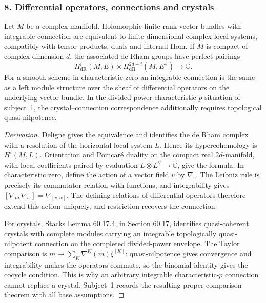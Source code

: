 \subsubsection{8. Differential operators, connections and crystals}
\begin{proposition}\label{B:subject8}
Let $M$ be a complex manifold. Holomorphic finite-rank vector bundles with integrable connection are equivalent to finite-dimensional complex local systems, compatibly with tensor products, duals and internal Hom. If $M$ is compact of complex dimension $d$, the associated de Rham groups have perfect pairings
\[
 H^i_{\mathrm{dR}}(M,E)\times H^{2d-i}_{\mathrm{dR}}(M,E^\vee)
 \longrightarrow\mathbb C.
\]
For a smooth scheme in characteristic zero an integrable connection is the same as a left module structure over the sheaf of differential operators on the underlying vector bundle. In the divided-power characteristic-$p$ situation of subject~1, the crystal--connection correspondence additionally requires topological quasi-nilpotence.
\end{proposition}
\begin{proof}[Derivation]
Deligne \cite[I, Theorem 2.17 and Propositions 2.18--2.19]{BDeligne1970} gives the equivalence and identifies the de Rham complex with a resolution of the horizontal local system $L$. Hence its hypercohomology is $H^i(M,L)$. Orientation and Poincar\'e duality on the compact real $2d$-manifold, with local coefficients paired by evaluation $L\otimes L^\vee\to\mathbb C$, give the formula. In characteristic zero, define the action of a vector field $v$ by $\nabla_v$. The Leibniz rule is precisely its commutator relation with functions, and integrability gives $[\nabla_v,\nabla_w]=\nabla_{[v,w]}$. The defining relations of differential operators therefore extend this action uniquely, and restriction recovers the connection.

For crystals, Stacks Lemma 60.17.4, in Section 60.17, identifies quasi-coherent crystals with complete modules carrying an integrable topologically quasi-nilpotent connection on the completed divided-power envelope. The Taylor comparison is $m\mapsto\sum_K\nabla^K(m)\xi^{[K]}$: quasi-nilpotence gives convergence and integrability makes the operators commute, so the binomial identity gives the cocycle condition. This is why an arbitrary integrable characteristic-$p$ connection cannot replace a crystal. Subject~1 records the resulting proper comparison theorem with all base assumptions.
\end{proof}

